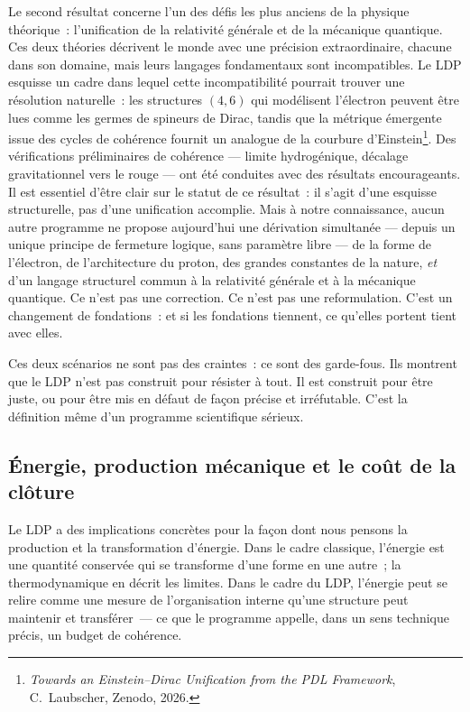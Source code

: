 \documentclass[12pt, a4paper, openright]{book}
\begin{document}
Le second résultat concerne l'un des défis les plus anciens de la physique théorique~: l'unification de la relativité générale et de la mécanique quantique. Ces deux théories décrivent le monde avec une précision extraordinaire, chacune dans son domaine, mais leurs langages fondamentaux sont incompatibles. Le LDP esquisse un cadre dans lequel cette incompatibilité pourrait trouver une résolution naturelle~: les structures $(4,6)$ qui modélisent l'électron peuvent être lues comme les germes de spineurs de Dirac, tandis que la métrique émergente issue des cycles de cohérence fournit un analogue de la courbure d'Einstein\footnote{\textit{Towards an Einstein--Dirac Unification from the PDL Framework}, C.~Laubscher, Zenodo, 2026.}. Des vérifications préliminaires de cohérence --- limite hydrogénique, décalage gravitationnel vers le rouge --- ont été conduites avec des résultats encourageants. Il est essentiel d'être clair sur le statut de ce résultat~: il s'agit d'une esquisse structurelle, pas d'une unification accomplie. Mais à notre connaissance, aucun autre programme ne propose aujourd'hui une dérivation simultanée --- depuis un unique principe de fermeture logique, sans paramètre libre --- de la forme de l'électron, de l'architecture du proton, des grandes constantes de la nature, \emph{et} d'un langage structurel commun à la relativité générale et à la mécanique quantique. Ce n'est pas une correction. Ce n'est pas une reformulation. C'est un changement de fondations~: et si les fondations tiennent, ce qu'elles portent tient avec elles.

\medskip

Ces deux scénarios ne sont pas des craintes~: ce sont des garde-fous. Ils montrent que le LDP n'est pas construit pour résister à tout. Il est construit pour être juste, ou pour être mis en défaut de façon précise et irréfutable. C'est la définition même d'un programme scientifique sérieux.

\subsection*{Énergie, production mécanique et le coût de la clôture}

Le LDP a des implications concrètes pour la façon dont nous pensons la production et la transformation d'énergie. Dans le cadre classique, l'énergie est une quantité conservée qui se transforme d'une forme en une autre~; la thermodynamique en décrit les limites. Dans le cadre du LDP, l'énergie peut se relire comme une mesure de l'organisation interne qu'une structure peut maintenir et transférer~--- ce que le programme appelle, dans un sens technique précis, un budget de cohérence.
\end{document}
